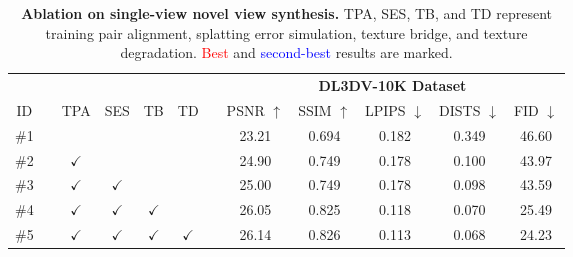 \begin{table}[t]
\caption{\textbf{Ablation on single-view novel view synthesis.} TPA, SES, TB, and TD represent training pair alignment, splatting error simulation, texture bridge, and texture degradation. \textcolor{red}{Best} and \textcolor{blue}{second-best} results are marked.}
\label{tab:main-ablation}
\setlength\tabcolsep{2.1pt}
\begin{tabular}{cccccccccccc}
\toprule[0.15em]
                        &  &  &     &  &    &  & \multicolumn{5}{c}{\textbf{DL3DV-10K Dataset}}                                                                                                                                 \\ \cline{8-12} 
\multirow{-2}{*}{ID} &  & \multirow{-2}{*}{TPA}     & \multirow{-2}{*}{SES}   & \multirow{-2}{*}{TB} & \multirow{-2}{*}{TD} &  & PSNR $\uparrow$                         & SSIM $\uparrow$                          & LPIPS $\downarrow$                        & DISTS $\downarrow$                        & FID $\downarrow$                         \\ \midrule[0.15em]
\#1                     &                &                  &               &            &             &  & 23.21                        & 0.694                        & 0.182                        & 0.349                        & 46.60                        \\
\#2                     &  & $\checkmark$                          &              &            &             &  & 24.90                        & 0.749                        & 0.178                        & 0.100                        & 43.97                        \\
\#3                     &  & $\checkmark$         & $\checkmark$             &              &                   &  & 25.00                        & 0.749                        & 0.178                        & 0.098                        & 43.59                        \\
\#4                     &  & $\checkmark$         & $\checkmark$             & $\checkmark$            &             &  & {\color{blue} 26.05} & {\color{blue} 0.825} & {\color{blue} 0.118} & {\color{blue} 0.070} & {\color{blue} 25.49} \\
\#5                     &  & $\checkmark$         & $\checkmark$             & $\checkmark$        & $\checkmark$        &  & {\color{red} 26.14} & {\color{red} 0.826} & {\color{red} 0.113} & {\color{red} 0.068} & {\color{red} 24.23} \\ \bottomrule[0.15em]
\end{tabular}
\vspace{-0.5em}
\end{table}











